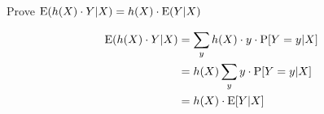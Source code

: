 \question Prove $\text{E}(h(X) \cdot Y|X) = h(X) \cdot \text{E}(Y|X)$
\begin{solution}[1.5 cm]
\begin{align*}
\text{E}(h(X) \cdot Y|X) &= \sum_y h(X) \cdot y \cdot \text{P}[Y=y|X] \\
&= h(X) \sum_y y \cdot \text{P}[Y=y|X] \\
&= h(X) \cdot \text{E}[Y|X]
\end{align*}
\end{solution}